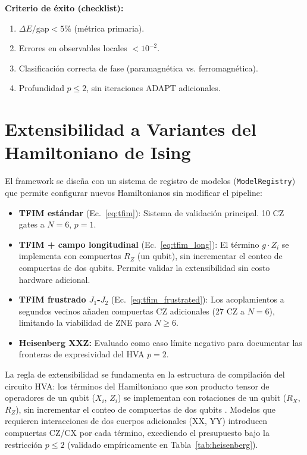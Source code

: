 \documentclass[11pt,a4paper,spanish]{book}
\begin{document}
\textbf{Criterio de éxito (checklist):}
\begin{enumerate}
    \item $\Delta E/\text{gap} < 5\%$ (métrica primaria).
    \item Errores en observables locales $< 10^{-2}$.
    \item Clasificación correcta de fase (paramagnética vs. ferromagnética).
    \item Profundidad $p \leq 2$, sin iteraciones ADAPT adicionales.
\end{enumerate}

\section{Extensibilidad a Variantes del Hamiltoniano de Ising}

El framework se diseña con un sistema de registro de modelos (\texttt{ModelRegistry}) que permite configurar nuevos Hamiltonianos sin modificar el pipeline:

\begin{itemize}
    \item \textbf{TFIM estándar} (Ec.~\ref{eq:tfim}): Sistema de validación principal. 10 CZ gates a $N=6$, $p=1$.
    \item \textbf{TFIM + campo longitudinal} (Ec.~\ref{eq:tfim_long}): El término $g \cdot Z_i$ se implementa con compuertas $R_Z$ (un qubit), sin incrementar el conteo de compuertas de dos qubits. Permite validar la extensibilidad sin costo hardware adicional.
    \item \textbf{TFIM frustrado $J_1$-$J_2$} (Ec.~\ref{eq:tfim_frustrated}): Los acoplamientos a segundos vecinos añaden compuertas CZ adicionales (27 CZ a $N=6$), limitando la viabilidad de ZNE para $N \geq 6$.
    \item \textbf{Heisenberg XXZ:} Evaluado como caso límite negativo para documentar las fronteras de expresividad del HVA $p=2$.
\end{itemize}

La regla de extensibilidad se fundamenta en la estructura de compilación del circuito HVA: los términos del Hamiltoniano que son producto tensor de operadores de un qubit ($X_i$, $Z_i$) se implementan con rotaciones de un qubit ($R_X$, $R_Z$), sin incrementar el conteo de compuertas de dos qubits \citep{wiersema2020}. Modelos que requieren interacciones de dos cuerpos adicionales (XX, YY) introducen compuertas CZ/CX por cada término, excediendo el presupuesto bajo la restricción $p \leq 2$ (validado empíricamente en Tabla~\ref{tab:heisenberg}).
\end{document}
